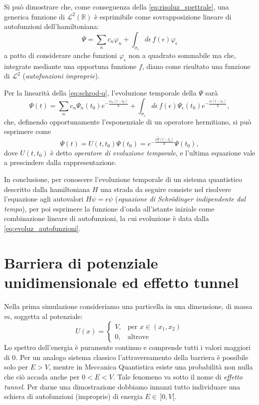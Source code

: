 Si può dimostrare che, come conseguenza della \eqref{eq:risoluz_spettrale}, 
una generica funzione di $\mathcal{L}^2(\mathbb{R})$ è esprimibile
come sovrapposizione lineare di autofunzioni dell'hamiltoniana:
\[
  \Psi = \sum_{n} c_n \varphi_n + 
  \int_{\sigma_c} d\epsilon\,f(\epsilon)\varphi_{\epsilon}
\]
a patto di considerare anche funzioni $\varphi_{\epsilon}$ non a quadrato
sommabile ma che, integrate mediante una opportuna funzione $f$,
diano come risultato una funzione di $\mathcal{L}^2$ (\emph{autofunzioni
improprie}).

Per la linearità della \eqref{eq:schrod-q}, l'evoluzione temporale
della $\Psi$ sarà
\begin{equation}
  \Psi(t) = \sum_{n} c_n \Psi_n(t_0) e^{-\frac{i\epsilon_n(t-t_0)}{\hbar}} + 
  \int_{\sigma_c} d\epsilon\,f(\epsilon)\Psi_{\epsilon}(t_0)
  e^{-\frac{i\epsilon(t-t_0)}{\hbar}}, \label{eq:evoluz_autofunzioni}
\end{equation}
che, definendo opportunamente l'esponenziale di un operatore hermitiano,
si può esprimere come
\[
  \Psi(t) = U(t,t_0)\Psi(t_0) = e^{-\frac{i\hat{H}(t-t_0)}{\hbar}} \Psi(t_0) ,
\]
dove $U(t,t_0)$ è detto \emph{operatore di evoluzione temporale}, e
l'ultima equazione vale a prescindere dalla rappresentazione.

In conclusione, per conoscere l'evoluzione temporale di un sistema
quantistico descritto dalla hamiltoniana $H$ una strada da seguire
consiste nel risolvere l'equazione agli autovalori $H\psi=\epsilon\psi$
(\emph{equazione di Schr\"odinger indipendente dal tempo}), 
per poi esprimere la funzione d'onda all'istante iniziale come
combinazione lineare di autofunzioni, la cui evoluzione è data
dalla \eqref{eq:evoluz_autofunzioni}.

\clearpage\section{Barriera di potenziale unidimensionale ed effetto tunnel}

Nella prima simulazione consideriamo una particella in una dimensione, 
di massa $m$, 
soggetta al potenziale:
\[
U(x)=\begin{cases}
	V,	& \text{per }x \in (x_1, x_2) \\
	0,	& \text{altrove } 
\end{cases}
\]
Lo spettro dell'energia è puramente continuo e comprende tutti i valori
maggiori di $0$. Per un analogo sistema classico l'attraversamento della
barriera è possibile solo per $E>V$, mentre in Meccanica Quantistica
esiste una probabilità non nulla che ciò accada anche per $0<E<V$. Tale
fenomeno va sotto il nome di \emph{effetto tunnel}.
Per darne una dimostrazione dobbiamo 
innanzi tutto individuare una schiera di autofunzioni (improprie)
di energia $E \in\,]0, V[ $.

